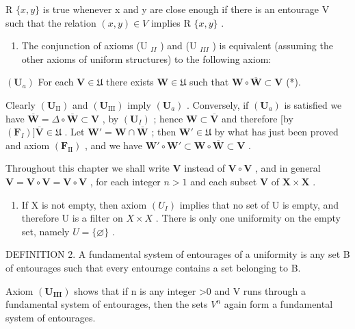 R \(\{x,y\}\) is true whenever x and y are close enough if there is an entourage V such that the relation \((x,y)\in V\) implies R \(\{x,y\}\) .

\begin{enumerate}
\def\labelenumi{\arabic{enumi})}
\setcounter{enumi}{1}
\tightlist
\item
  The conjunction of axioms (U \(_{II}\) ) and (U \(_{III}\) ) is equivalent (assuming the other axioms of uniform structures) to the following axiom:
\end{enumerate}

\((\mathbf{U}_a)\) For each \(\mathbf{V} \in \mathfrak{U}\) there exists \(\mathbf{W} \in \mathfrak{U}\) such that \(\mathbf{W} \circ \overline{\mathbf{W}} \subset \mathbf{V}\) (*).

Clearly \((\mathbf{U}_{\mathrm{II}})\) and \((\mathbf{U}_{\mathrm{III}})\) imply \((\mathbf{U}_a)\) . Conversely, if \((\mathbf{U}_a)\) is satisfied we have \(\overline{\mathbf{W}} = \Delta \circ \overline{\mathbf{W}} \subset \mathbf{V}\) , by \((\mathbf{U}_I)\) ; hence \(\mathbf{W} \subset \overline{\mathbf{V}}\) and therefore {[}by \((\mathbf{F}_I)] \overline{\mathbf{V}} \in \mathfrak{U}\) . Let \(\mathbf{W}' = \mathbf{W} \cap \overline{\mathbf{W}}\) ; then \(\mathbf{W}' \in \mathfrak{U}\) by what has just been proved and axiom \((\mathbf{F}_{\mathrm{II}})\) , and we have \(\mathbf{W}' \circ \mathbf{W}' \subset \mathbf{W} \circ \overline{\mathbf{W}} \subset \mathbf{V}\) .

Throughout this chapter we shall write \(\mathbf{V}\) instead of \(\mathbf{V} \circ \mathbf{V}\) , and in general \(\mathbf{V} = \mathbf{V} \circ \mathbf{V} = \mathbf{V} \circ \mathbf{V}\) , for each integer \(n > 1\) and each subset \(\mathbf{V}\) of \(\mathbf{X} \times \mathbf{X}\) .

\begin{enumerate}
\def\labelenumi{\arabic{enumi})}
\setcounter{enumi}{2}
\tightlist
\item
  If X is not empty, then axiom \((U_{I})\) implies that no set of U is empty, and therefore U is a filter on \(X \times X\) . There is only one uniformity on the empty set, namely \(U = \{\varnothing\}\) .
\end{enumerate}

DEFINITION 2. A fundamental system of entourages of a uniformity is any set B of entourages such that every entourage contains a set belonging to B.

Axiom \((\mathbf{U}_{\mathbf{III}})\) shows that if n is any integer \textgreater0 and V runs through a fundamental system of entourages, then the sets \(V^{n}\) again form a fundamental system of entourages.

